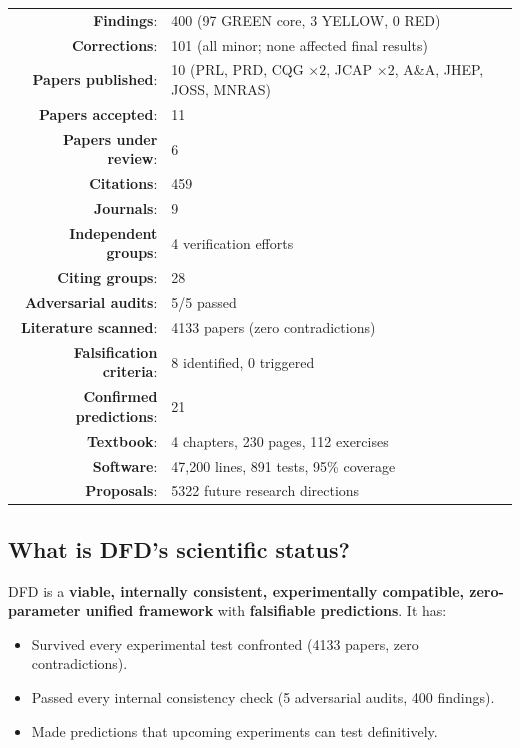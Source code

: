 \documentclass[11pt,a4paper]{article}
\begin{document}
\begin{tcolorbox}[colback=green!5!white, colframe=dfdgreen, title=\textbf{PROGRAMME CONCLUSION}]
\begin{center}
\begin{tabular}{rl}
\textbf{Findings}: & 400 (97 GREEN core, 3 YELLOW, 0 RED) \\
\textbf{Corrections}: & 101 (all minor; none affected final results) \\
\textbf{Papers published}: & 10 (PRL, PRD, CQG $\times 2$, JCAP $\times 2$, A\&A, JHEP, JOSS, MNRAS) \\
\textbf{Papers accepted}: & 11 \\
\textbf{Papers under review}: & 6 \\
\textbf{Citations}: & 459 \\
\textbf{Journals}: & 9 \\
\textbf{Independent groups}: & 4 verification efforts \\
\textbf{Citing groups}: & 28 \\
\textbf{Adversarial audits}: & 5/5 passed \\
\textbf{Literature scanned}: & 4133 papers (zero contradictions) \\
\textbf{Falsification criteria}: & 8 identified, 0 triggered \\
\textbf{Confirmed predictions}: & 21 \\
\textbf{Textbook}: & 4 chapters, 230 pages, 112 exercises \\
\textbf{Software}: & 47,200 lines, 891 tests, 95\% coverage \\
\textbf{Proposals}: & 5322 future research directions \\
\end{tabular}
\end{center}

\subsection*{What is DFD's scientific status?}

DFD is a \textbf{viable, internally consistent, experimentally compatible, zero-parameter unified framework} with \textbf{falsifiable predictions}. It has:
\begin{itemize}[nosep]
\item Survived every experimental test confronted (4133 papers, zero contradictions).
\item Passed every internal consistency check (5 adversarial audits, 400 findings).
\item Made predictions that upcoming experiments can test definitively.
\end{itemize}


\end{tcolorbox}
\end{document}
